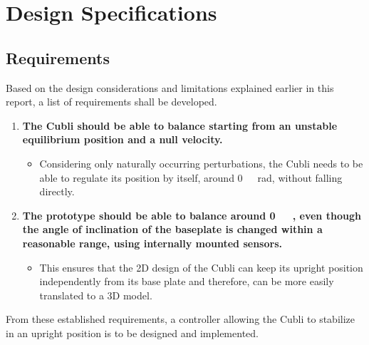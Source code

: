 \chapter{Design Specifications}\label{chap:specifications}


\section{Requirements}\label{sec:requirements}
Based on the design considerations and limitations explained earlier in this report, a list of requirements shall be developed.
%
\begin{enumerate}
\item \textbf{The Cubli should be able to balance starting from an unstable equilibrium position and a null velocity.}
  \begin{itemize}
  \item[] Considering only naturally occurring perturbations, the Cubli needs to be able to regulate its position by itself, around \si{0\ rad}, without falling directly.
  \end{itemize}

\item \textbf{The prototype should be able to balance around \si{0\ \rad}, even though the angle of inclination of the baseplate is changed within a reasonable range, using internally mounted sensors.}  
  \begin{itemize}
  \item[] This ensures that the 2D design of the Cubli can keep its upright position independently from its base plate and therefore, can be more easily translated to a 3D model.
  \end{itemize}
%  
%  	
\end{enumerate}
%
From these established requirements, a controller allowing the Cubli to stabilize in an upright position is to be designed and implemented.

